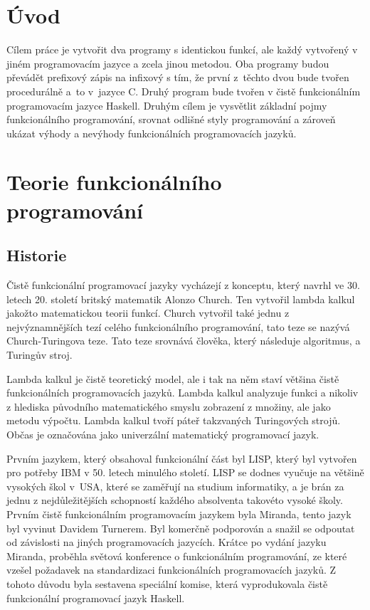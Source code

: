 \documentclass[12pt,a4paper]{report}
\begin{document}



\tableofcontents

\chapter{Úvod}
Cílem práce je vytvořit dva programy s identickou funkcí, ale každý vytvořený v jiném programovacím jazyce a zcela jinou metodou. Oba programy budou převádět prefixový zápis na infixový s tím, že první z~těchto dvou bude tvořen procedurálně a~to v~jazyce C. Druhý program bude tvořen v čistě funkcionálním programovacím jazyce Haskell. Druhým cílem je vysvětlit základní pojmy funkcionálního programování, srovnat odlišné styly programování a zároveň ukázat výhody a nevýhody funkcionálních programovacích jazyků. 

\chapter{Teorie funkcionálního programování} %

\section{Historie}
Čistě funkcionální programovací jazyky vycházejí z konceptu, který navrhl ve 30. letech 20. století britský matematik Alonzo Church. Ten vytvořil lambda kalkul jakožto matematickou teorii funkcí. Church vytvořil také jednu z nejvýznamnějších tezí celého funkcionálního programování, tato teze se nazývá Church-Turingova teze. \cite{Funk. prog. wiki.} Tato teze srovnává člověka, který následuje algoritmus, a Turingův stroj.

Lambda kalkul je čistě teoretický model, ale i tak na něm staví většina čistě funkcionálních programovacích jazyků. Lambda kalkul analyzuje funkci a nikoliv z hlediska původního matematického smyslu zobrazení z množiny, ale jako metodu výpočtu. \cite{lambda kalkul wiki.} Lambda kalkul tvoří páteř takzvaných Turingových strojů. Občas je označována jako univerzální matematický programovací jazyk.

Prvním jazykem, který obsahoval funkcionální část byl LISP, který byl vytvořen pro potřeby IBM v 50. letech minulého století. LISP se dodnes vyučuje na většině vysokých škol v~USA, které se zaměřují na studium informatiky, a je brán za jednu z nejdůležitějších schopností každého absolventa takovéto vysoké školy. Prvním čistě funkcionálním programovacím jazykem byla Miranda, tento jazyk byl vyvinut Davidem Turnerem. Byl komerčně podporován a snažil se odpoutat od závislosti na jiných programovacích jazycích. Krátce po vydání jazyku Miranda, proběhla světová konference o funkcionálním programování, ze které vzešel požadavek na standardizaci funkcionálních programovacích jazyků. \cite{Funk. prog. wiki.} Z tohoto důvodu byla sestavena speciální komise, která vyprodukovala čistě funkcionální programovací jazyk Haskell. 
\end{document}
